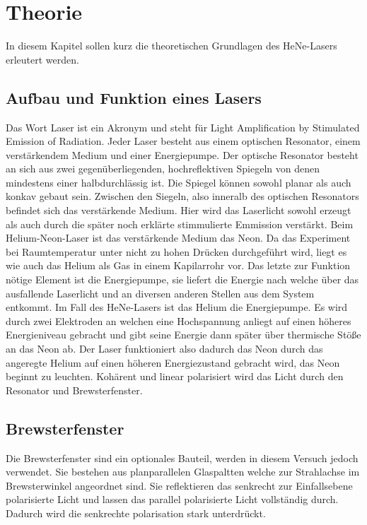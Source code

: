 \section{Theorie}
\label{sec:Theorie}
In diesem Kapitel sollen kurz die theoretischen Grundlagen des HeNe-Lasers erleutert werden.

\subsection{Aufbau und Funktion eines Lasers}
\label{sec:aufbauUndFunktion}
Das Wort Laser ist ein Akronym und steht für Light Amplification by Stimulated Emission of Radiation.
Jeder Laser besteht aus einem optischen Resonator, einem verstärkendem Medium und einer Energiepumpe.
Der optische Resonator besteht an sich aus zwei gegenüberliegenden, hochreflektiven Spiegeln von 
denen mindestens einer halbdurchlässig ist. Die Spiegel können sowohl planar als auch konkav gebaut sein.
Zwischen den Siegeln, also inneralb des optischen Resonators befindet sich das verstärkende Medium. Hier 
wird das Laserlicht sowohl erzeugt als auch durch die später noch erklärte stimmulierte Emmission
verstärkt. Beim Helium-Neon-Laser ist das verstärkende Medium das Neon. Da das Experiment bei Raumtemperatur 
unter nicht zu hohen Drücken durchgeführt wird, liegt es wie auch das Helium als Gas in einem Kapilarrohr vor.
Das letzte zur Funktion nötige Element ist die Energiepumpe, sie liefert die Energie nach welche über das 
ausfallende Laserlicht und an diversen anderen Stellen aus dem System entkommt. Im Fall des HeNe-Lasers
ist das Helium die Energiepumpe. Es wird durch zwei Elektroden an welchen eine Hochspannung anliegt
auf einen höheres Energieniveau gebracht und gibt seine Energie dann später über thermische Stöße an das 
Neon ab. Der Laser funktioniert also dadurch das Neon durch das angeregte Helium auf einen höheren 
Energiezustand gebracht wird, das Neon beginnt zu leuchten. Kohärent und linear polarisiert wird das Licht
durch den Resonator und Brewsterfenster.

\subsection{Brewsterfenster}
\label{sec:Brewsterfenster}
Die Brewsterfenster sind ein optionales Bauteil, werden in diesem Versuch jedoch verwendet.
Sie bestehen aus planparallelen Glaspaltten welche zur Strahlachse im Brewsterwinkel angeordnet sind.
Sie reflektieren das senkrecht zur Einfallsebene polarisierte Licht und lassen das parallel polarisierte 
Licht vollständig durch. Dadurch wird die senkrechte polarisation stark unterdrückt.

